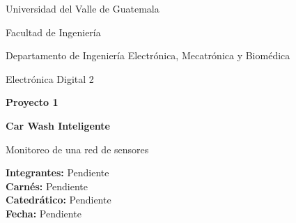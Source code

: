 \begin{titlepage}
\centering
{\Large Universidad del Valle de Guatemala\par}
\vspace{0.4cm}
{\large Facultad de Ingeniería\par}
{\large Departamento de Ingeniería Electrónica, Mecatrónica y Biomédica\par}
\vspace{1.5cm}
{\Large Electrónica Digital 2\par}
\vspace{1.2cm}
{\Huge\bfseries Proyecto 1\par}
\vspace{0.3cm}
{\LARGE\bfseries Car Wash Inteligente\par}
\vspace{0.5cm}
{\Large Monitoreo de una red de sensores\par}
\vfill
\begin{flushleft}
\textbf{Integrantes:} Pendiente\\
\textbf{Carnés:} Pendiente\\
\textbf{Catedrático:} Pendiente\\
\textbf{Fecha:} Pendiente
\end{flushleft}
\vfill
\end{titlepage}
